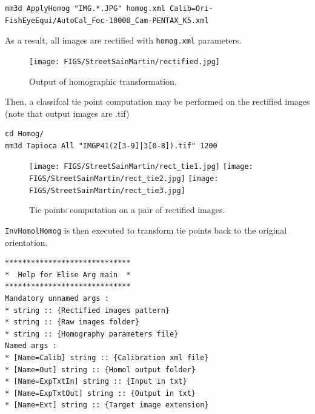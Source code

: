 \begin{verbatim}
mm3d ApplyHomog "IMG.*.JPG" homog.xml Calib=Ori-FishEyeEqui/AutoCal_Foc-10000_Cam-PENTAX_K5.xml
\end{verbatim}

\noindent As a result, all images are rectified with \texttt{homog.xml} parameters. \newline

\begin{figure}[!h]
	\begin{center}
		\texttt{[image: FIGS/StreetSainMartin/rectified.jpg]}
		\caption{Output of homographic transformation.}
	\end{center}	
\end{figure}

\noindent Then, a classifcal tie point computation may be performed on the rectified images (note that output images are .tif) \newline

\begin{verbatim}
cd Homog/
mm3d Tapioca All "IMGP41(2[3-9]|3[0-8]).tif" 1200
\end{verbatim} 

\begin{figure}[!h]
	\begin{center}
		\texttt{[image: FIGS/StreetSainMartin/rect\_tie1.jpg]}
		\texttt{[image: FIGS/StreetSainMartin/rect\_tie2.jpg]}
		\texttt{[image: FIGS/StreetSainMartin/rect\_tie3.jpg]}
		\caption{Tie points computation on a pair of rectified images.}
	\end{center}	
\end{figure}

\noindent \texttt{InvHomolHomog} is then executed to transform tie points back to the original orientation. \newline



\begin{verbatim}
*****************************
*  Help for Elise Arg main  *
*****************************
Mandatory unnamed args : 
* string :: {Rectified images pattern}
* string :: {Raw images folder}
* string :: {Homography parameters file}
Named args : 
* [Name=Calib] string :: {Calibration xml file}
* [Name=Out] string :: {Homol output folder}
* [Name=ExpTxtIn] string :: {Input in txt}
* [Name=ExpTxtOut] string :: {Output in txt}
* [Name=Ext] string :: {Target image extension}
\end{verbatim} 
\vspace{0.5cm}

